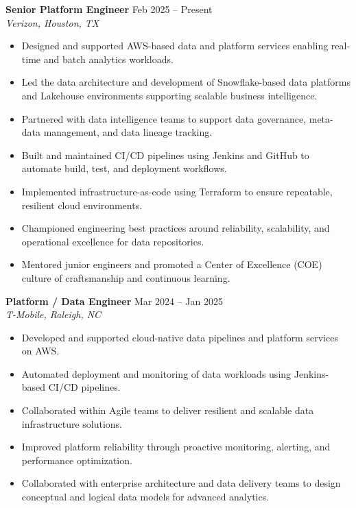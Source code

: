 \documentclass[10pt]{article}
\begin{document}
\textbf{Senior Platform Engineer} \hfill Feb 2025 -- Present \\
\textit{Verizon, Houston, TX}
\begin{itemize}[leftmargin=*, itemsep=3pt]
    \item Designed and supported AWS-based data and platform services enabling real-time and batch analytics workloads.
    \item Led the data architecture and development of Snowflake-based data platforms and Lakehouse environments supporting scalable business intelligence.
    \item Partnered with data intelligence teams to support data governance, meta-data management, and data lineage tracking.
    \item Built and maintained CI/CD pipelines using Jenkins and GitHub to automate build, test, and deployment workflows.
    \item Implemented infrastructure-as-code using Terraform to ensure repeatable, resilient cloud environments.
    \item Championed engineering best practices around reliability, scalability, and operational excellence for data repositories.
    \item Mentored junior engineers and promoted a Center of Excellence (COE) culture of craftsmanship and continuous learning.
\end{itemize}

\textbf{Platform / Data Engineer} \hfill Mar 2024 -- Jan 2025 \\
\textit{T-Mobile, Raleigh, NC}
\begin{itemize}[leftmargin=*, itemsep=3pt]
    \item Developed and supported cloud-native data pipelines and platform services on AWS.
    \item Automated deployment and monitoring of data workloads using Jenkins-based CI/CD pipelines.
    \item Collaborated within Agile teams to deliver resilient and scalable data infrastructure solutions.
    \item Improved platform reliability through proactive monitoring, alerting, and performance optimization.
    \item Collaborated with enterprise architecture and data delivery teams to design conceptual and logical data models for advanced analytics.
\end{itemize}
\end{document}
